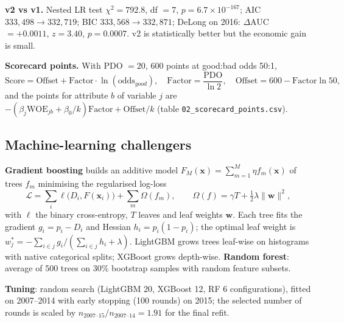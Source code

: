 \documentclass[11pt,a4paper]{article}
\newcommand{\1}{\mathbf{1}}
\begin{document}
\begin{table}[H]\centering\small
\caption{Scorecard v1 (5 WOE variables), fitted on 2007--2015. LR test vs null $\chi^2=22{,}585$, pseudo-$R^2=0.063$.}

\end{table}
\begin{table}[H]\centering\small
\caption{Scorecard v2 (12 WOE variables), fitted on 2007--2015.}

\end{table}

\textbf{v2 vs v1.} Nested LR test $\chi^2=792.8$, df $=7$, $p=6.7\times10^{-167}$; AIC $333{,}498\to332{,}719$; BIC $333{,}568\to332{,}871$; DeLong on 2016: $\Delta$AUC $=+0.0011$, $z=3.40$, $p=0.0007$. v2 is statistically better but the economic gain is small.

\textbf{Scorecard points.} With PDO $=20$, 600 points at good:bad odds 50:1,
\begin{equation}
\text{Score}=\text{Offset}+\text{Factor}\cdot\ln(\text{odds}_{good}),\quad \text{Factor}=\frac{\text{PDO}}{\ln 2},\quad \text{Offset}=600-\text{Factor}\ln 50,
\end{equation}
and the points for attribute $b$ of variable $j$ are $-\left(\beta_j\mathrm{WOE}_{jb}+\beta_0/k\right)\text{Factor}+\text{Offset}/k$ (table \texttt{02\_scorecard\_points.csv}).

\subsection{Machine-learning challengers}
\textbf{Gradient boosting} builds an additive model $F_M(\bm x)=\sum_{m=1}^{M}\eta f_m(\bm x)$ of trees $f_m$ minimising the regularised log-loss
\begin{equation}
\mathcal{L}=\sum_i \ell\big(D_i,F(\bm x_i)\big)+\sum_m\Omega(f_m),\qquad \Omega(f)=\gamma T+\tfrac12\lambda\|\bm w\|^2,
\end{equation}
with $\ell$ the binary cross-entropy, $T$ leaves and leaf weights $\bm w$. Each tree fits the gradient $g_i=p_i-D_i$ and Hessian $h_i=p_i(1-p_i)$; the optimal leaf weight is $w_j^*=-\sum_{i\in j}g_i/(\sum_{i\in j}h_i+\lambda)$. LightGBM grows trees leaf-wise on histograms with native categorical splits; XGBoost grows depth-wise.
\textbf{Random forest}: average of 500 trees on 30\% bootstrap samples with random feature subsets.

\textbf{Tuning}: random search (LightGBM 20, XGBoost 12, RF 6 configurations), fitted on 2007--2014 with early stopping (100 rounds) on 2015; the selected number of rounds is scaled by $n_{2007\text{--}15}/n_{2007\text{--}14}=1.91$ for the final refit.
\begin{table}[H]\centering\small
\caption{Selected hyper-parameters. Best 2015 holdout AUC: LightGBM 0.7355, XGBoost 0.7344, RF 0.7246.}

\end{table}
\end{document}
